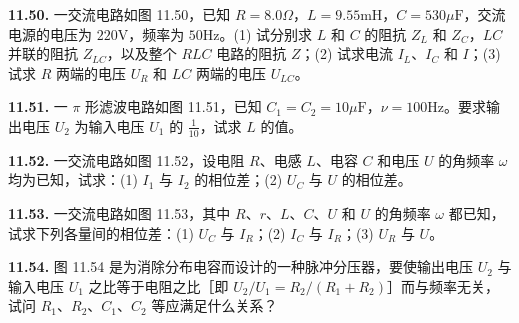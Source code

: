 \begin{center}
\end{center}

\vfill
\newpage

\textbf{11.50.} 一交流电路如图 11.50，已知 $R = 8.0\Omega$，$L = 9.55\mathrm{mH}$，$C = 530\mu\mathrm{F}$，交流电源的电压为 $220\mathrm{V}$，频率为 $50\mathrm{Hz}$。(1) 试分别求 $L$ 和 $C$ 的阻抗 $Z_{L}$ 和 $Z_{C}$，$LC$ 并联的阻抗 $Z_{LC}$，以及整个 $RLC$ 电路的阻抗 $Z$；(2) 试求电流 $I_{L}$、$I_{C}$ 和 $I$；(3) 试求 $R$ 两端的电压 $U_{R}$ 和 $LC$ 两端的电压 $U_{LC}$。

\begin{center}
\end{center}

\vfill
\newpage

\textbf{11.51.} 一 $\pi$ 形滤波电路如图 11.51，已知 $C_1 = C_2 = 10\mu\mathrm{F}$，$\nu = 100\mathrm{Hz}$。要求输出电压 $U_2$ 为输入电压 $U_1$ 的 $\displaystyle \frac{1}{10}$，试求 $L$ 的值。

\begin{center}
\end{center}

\vfill
\newpage

\textbf{11.52.} 一交流电路如图 11.52，设电阻 $R$、电感 $L$、电容 $C$ 和电压 $U$ 的角频率 $\omega$ 均为已知，试求：(1) $I_{1}$ 与 $I_{2}$ 的相位差；(2) $U_{C}$ 与 $U$ 的相位差。

\begin{center}
\end{center}

\vfill
\newpage

\textbf{11.53.} 一交流电路如图 11.53，其中 $R$、$r$、$L$、$C$、$U$ 和 $U$ 的角频率 $\omega$ 都已知，试求下列各量间的相位差：(1) $U_{C}$ 与 $I_{R}$；(2) $I_{C}$ 与 $I_{R}$；(3) $U_{R}$ 与 $U$。

\begin{center}
\end{center}

\vfill
\newpage

\textbf{11.54.} 图 11.54 是为消除分布电容而设计的一种脉冲分压器，要使输出电压 $U_{2}$ 与输入电压 $U_{1}$ 之比等于电阻之比［即 $U_{2}/U_{1} = R_{2}/(R_{1}+R_{2})$］而与频率无关，试问 $R_{1}$、$R_{2}$、$C_{1}$、$C_{2}$ 等应满足什么关系？

